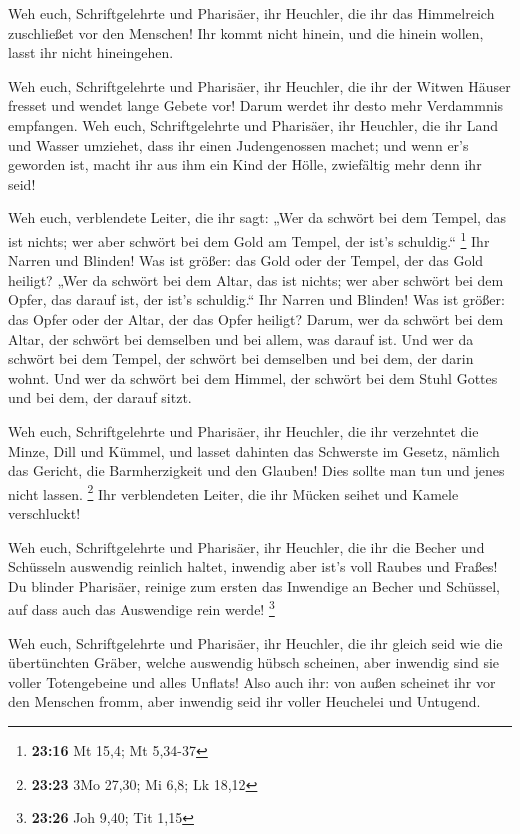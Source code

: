  Weh euch, Schriftgelehrte und Pharisäer, ihr Heuchler, die
ihr das Himmelreich zuschließet vor den Menschen! Ihr kommt nicht
hinein, und die hinein wollen, lasst ihr nicht hineingehen.

 Weh euch, Schriftgelehrte und Pharisäer, ihr Heuchler, die
ihr der Witwen Häuser fresset und wendet lange Gebete vor! Darum werdet
ihr desto mehr Verdammnis empfangen.  Weh euch,
Schriftgelehrte und Pharisäer, ihr Heuchler, die ihr Land und Wasser
umziehet, dass ihr einen Judengenossen machet; und wenn er's geworden
ist, macht ihr aus ihm ein Kind der Hölle, zwiefältig mehr denn ihr
seid!

 Weh euch, verblendete Leiter, die ihr sagt: „Wer da
schwört bei dem Tempel, das ist nichts; wer aber schwört bei dem Gold am
Tempel, der ist's schuldig.`` \footnote{\textbf{23:16} Mt 15,4; Mt
  5,34-37}  Ihr Narren und Blinden! Was ist größer: das
Gold oder der Tempel, der das Gold heiligt?  „Wer da
schwört bei dem Altar, das ist nichts; wer aber schwört bei dem Opfer,
das darauf ist, der ist's schuldig.``  Ihr Narren und
Blinden! Was ist größer: das Opfer oder der Altar, der das Opfer
heiligt?  Darum, wer da schwört bei dem Altar, der schwört
bei demselben und bei allem, was darauf ist.  Und wer da
schwört bei dem Tempel, der schwört bei demselben und bei dem, der darin
wohnt.  Und wer da schwört bei dem Himmel, der schwört bei
dem Stuhl Gottes und bei dem, der darauf sitzt.

 Weh euch, Schriftgelehrte und Pharisäer, ihr Heuchler, die
ihr verzehntet die Minze, Dill und Kümmel, und lasset dahinten das
Schwerste im Gesetz, nämlich das Gericht, die Barmherzigkeit und den
Glauben! Dies sollte man tun und jenes nicht lassen. \footnote{\textbf{23:23}
  3Mo 27,30; Mi 6,8; Lk 18,12}  Ihr verblendeten Leiter,
die ihr Mücken seihet und Kamele verschluckt!

 Weh euch, Schriftgelehrte und Pharisäer, ihr Heuchler, die
ihr die Becher und Schüsseln auswendig reinlich haltet, inwendig aber
ist's voll Raubes und Fraßes!  Du blinder Pharisäer,
reinige zum ersten das Inwendige an Becher und Schüssel, auf dass auch
das Auswendige rein werde! \footnote{\textbf{23:26} Joh 9,40; Tit 1,15}

 Weh euch, Schriftgelehrte und Pharisäer, ihr Heuchler, die
ihr gleich seid wie die übertünchten Gräber, welche auswendig hübsch
scheinen, aber inwendig sind sie voller Totengebeine und alles Unflats!
 Also auch ihr: von außen scheinet ihr vor den Menschen
fromm, aber inwendig seid ihr voller Heuchelei und Untugend.

